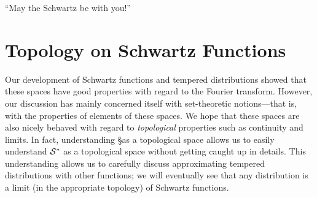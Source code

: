 
  \begin{savequote}
    ``May the Schwartz be with you!''
  \end{savequote}
  \chapter{Topology on Schwartz Functions}
    \label{ch:topons}
    Our development of Schwartz functions and tempered distributions showed that these spaces have good properties with regard to the Fourier transform.
    However, our discussion has mainly concerned itself with set-theoretic notions---that is, with the properties of elements of these spaces.
    We hope that these spaces are also nicely behaved with regard to \emph{topological} properties such as continuity and limits.
    In fact, understanding \S as a topological space allows us to easily understand $\mathcal{S}^*$ as a topological space without getting caught up in details.
    This understanding allows us to carefully discuss approximating tempered distributions with other functions; we will eventually see that any distribution is a limit (in the appropriate topology) of Schwartz functions.


